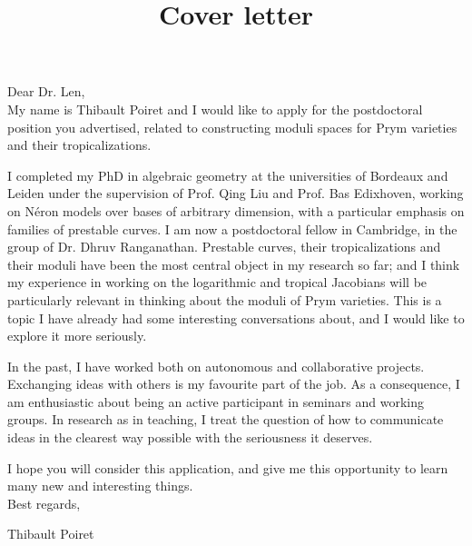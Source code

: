 \documentclass[12pt]{extarticle}
\title{Cover letter}
\date{}
\begin{document}
\maketitle

Dear Dr. Len,\\

My name is Thibault Poiret and I would like to apply for the postdoctoral position you advertised, related to constructing moduli spaces for Prym varieties and their tropicalizations.

I completed my PhD in algebraic geometry at the universities of Bordeaux and Leiden under the supervision of Prof. Qing Liu and Prof. Bas Edixhoven, working on Néron models over bases of arbitrary dimension, with a particular emphasis on families of prestable curves. I am now a postdoctoral fellow in Cambridge, in the group of Dr. Dhruv Ranganathan. Prestable curves, their tropicalizations and their moduli have been the most central object in my research so far; and I think my experience in working on the logarithmic and tropical Jacobians will be particularly relevant in thinking about the moduli of Prym varieties. This is a topic I have already had some interesting conversations about, and I would like to explore it more seriously.

In the past, I have worked both on autonomous and collaborative projects. Exchanging ideas with others is my favourite part of the job. As a consequence, I am enthusiastic about being an active participant in seminars and working groups. In research as in teaching, I treat the question of how to communicate ideas in the clearest way possible with the seriousness it deserves.


I hope you will consider this application, and give me this opportunity to learn many new and interesting things.\\

Best regards,

Thibault Poiret
\end{document}
